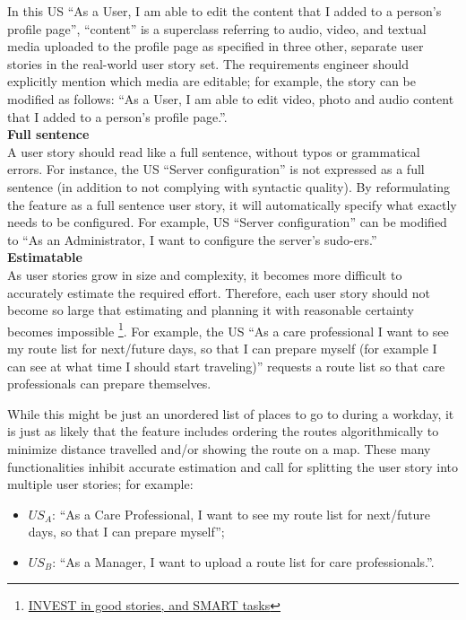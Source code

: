 In this US \enquote{As a User, I am able to edit the content that I added to a person's profile page}, \enquote{content} is a superclass referring to audio, video, and textual media uploaded to the profile page as specified in three other, separate user stories in the real-world user story set. The requirements engineer should explicitly mention which media are editable; for example, the story can be modified as follows: \enquote{As a User, I am able to edit video, photo and audio content that I added to a person’s profile page.}. \\ 
\textbf{Full sentence}\\ 
A user story should read like a full sentence, without typos or grammatical errors. For instance, the US \enquote{Server configuration} is not expressed as a full sentence (in addition to not complying with syntactic quality). By reformulating the feature as a full sentence user story, it will automatically specify what exactly needs to be configured. For example, US \enquote{Server configuration} can be modified to \enquote{As an Administrator, I want to configure the server’s sudo-ers.} \\ 
\textbf{Estimatable}\\ 
As user stories grow in size and complexity, it becomes more difficult to accurately estimate the required effort. Therefore, each user story should not become so large that estimating and planning it with reasonable certainty becomes impossible \footnote{\href{http://xp123.com/articles/invest-in-good-stories-and-smart-tasks/. Accessed 2015-02-18}{INVEST in good stories, and SMART tasks}}. For example, the US \enquote{As a care professional I want to see my route list for next/future days, so that I can prepare myself (for example I can see at what time I should start traveling)} requests a route list so that care professionals can prepare themselves. 

While this might be just an unordered list of places to go to during a workday, it is just as likely that the feature includes ordering the routes algorithmically to minimize distance travelled and/or showing the route on a map. These many functionalities inhibit accurate estimation and call for splitting the user story into multiple user stories; for example:
\begin{itemize}
\item $US_A$: \enquote{As a Care Professional, I want to see my route list for next/future days, so that I can prepare myself};
\item $US_B$: \enquote{As a Manager, I want to upload a route list for care professionals.}.
\end{itemize}


